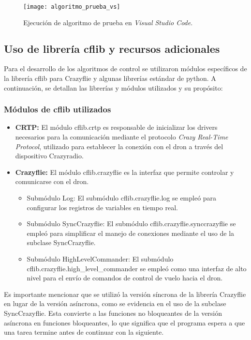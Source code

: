 \begin{figure}[htbp]
	\centering
	\texttt{[image: algoritmo\_prueba\_vs]}
	\caption{Ejecución de algoritmo de prueba en \textit{Visual Studio Code}.}
	\label{fig:algoritmo_prueba_vs}
\end{figure}

\newpage
\subsection{Uso de librería cflib y recursos adicionales}
Para el desarrollo de los algoritmos de control se utilizaron módulos específicos de la librería cflib para Crazyflie y algunas librerías estándar de python. A continuación, se detallan las librerías y módulos utilizados y su propósito:

\subsubsection{Módulos de cflib utilizados}

\begin{itemize}
	\item \textbf{CRTP:} El módulo cflib.crtp es responsable de inicializar los drivers necesarios para la comunicación mediante el protocolo \textit{Crazy Real-Time Protocol}, utilizado para establecer la conexión con el dron a través del dispositivo Crazyradio.
	\item \textbf{Crazyflie:} El módulo cflib.crazyflie es la interfaz que permite controlar y comunicarse con el dron. 
	\begin{itemize}
		\item Submódulo Log: El submódulo cflib.crazyflie.log se empleó para configurar los registros de variables en tiempo real.
		\item Submódulo SyncCrazyflie: El submódulo cflib.crazyflie.synccrazyflie se empleó para simplificar el manejo de conexiones mediante el uso de la subclase SyncCrazyflie. 
		\item Submódulo HighLevelCommander: El submódulo cflib.crazyflie.high\_level\_commander se empleó como una interfaz de alto nivel para el envío de comandos de control de vuelo hacia el dron. 
	\end{itemize}
\end{itemize} 

Es importante mencionar que se utilizó la versión síncrona de la librería Crazyflie en lugar de la versión asíncrona, como se evidencia en el uso de la subclase SyncCrazyflie. Esta convierte a las funciones no bloqueantes de la versión asíncrona en funciones bloqueantes, lo que significa que el programa espera a que una tarea termine antes de continuar con la siguiente.

